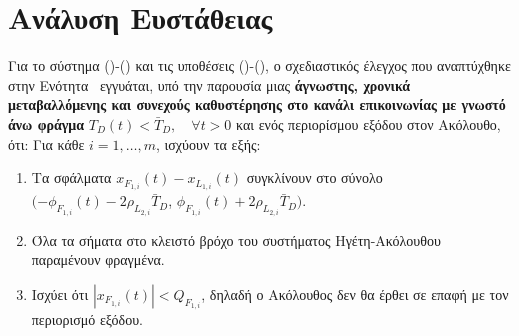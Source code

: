\section{Ανάλυση Ευστάθειας} \label{Chapter2Section3}

\bigskip
\begin{theorem}\label{the:main}
Για το σύστημα ()-() και τις υποθέσεις ()-(), ο σχεδιαστικός έλεγχος που αναπτύχθηκε στην Ενότητα~ εγγυάται, υπό την παρουσία μιας \textbf{άγνωστης, χρονικά μεταβαλλόμενης και συνεχούς καθυστέρησης στο κανάλι επικοινωνίας με γνωστό άνω φράγμα} $T_D(t) < \bar{T}_{D}, \quad \forall t>0$ και ενός περιορίσμου εξόδου στον Ακόλουθο, ότι:
Για κάθε $i = 1, \dots, m$, ισχύουν τα εξής:
\begin{enumerate}
    \item Τα σφάλματα $x_{F_{1,i}}(t) - x_{L_{1,i}}(t)$ συγκλίνουν στο σύνολο $( -\phi_{F_{1,i}}(t) - 2\rho_{L_{2,i}}\bar{T}_D$,  $\phi_{F_{1,i}}(t) + 2\rho_{L_{2,i}}\bar{T}_D )$.
    \item Όλα τα σήματα στο κλειστό βρόχο του συστήματος Ηγέτη-Ακόλουθου παραμένουν φραγμένα.
    \item Ισχύει ότι $|x_{F_{1,i}}(t)| < Q_{F_{1,i}}$, δηλαδή ο Ακόλουθος δεν θα έρθει σε επαφή με τον περιορισμό εξόδου.
\end{enumerate}
\end{theorem}

